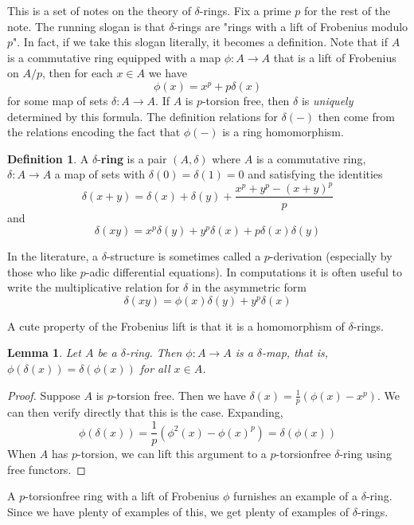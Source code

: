 \documentclass[12pt]{amsproc}
\newtheorem{lemma}{Lemma}
\theoremstyle{definition}
\newtheorem*{definition}{Definition}
\newcommand{\ra}{\rightarrow}
\begin{document}

This is a set of notes on the theory of $\delta$-rings. Fix a prime $p$ for the rest of the note. The running slogan is that $\delta$-rings are "rings with a lift of Frobenius modulo $p$". In fact, if we take this slogan literally, it becomes a definition. Note that if $A$ is a commutative ring equipped with a map $\phi:A\ra A$ that is a lift of Frobenius on $A/p$, then for each $x\in A$ we have
\[	\phi(x) = x^p + p\delta(x)	\]
for some map of sets $\delta:A\ra A$. If $A$ is $p$-torsion free, then $\delta$ is \textit{uniquely} determined by this formula. The definition relations for $\delta(-)$ then come from the relations encoding the fact that $\phi(-)$ is a ring homomorphism.

\begin{definition} A $\delta$-\textbf{ring} is a pair $(A,\delta)$ where $A$ is a commutative ring, $\delta:A\ra A$ a map of sets with $\delta(0)=\delta(1)=0$ and satisfying the identities
\[	\delta(x+y)=\delta(x)+\delta(y)+\frac{x^p+y^p-(x+y)^p}{p}\]
and
\[	\delta(xy)=x^p\delta(y)+y^p\delta(x)+p\delta(x)\delta(y)	\]
\end{definition}

In the literature, a $\delta$-structure is sometimes called a $p$-derivation (especially by those who like $p$-adic differential equations). In computations it is often useful to write the multiplicative relation for $\delta$ in the asymmetric form
\[	\delta(xy) = \phi(x)\delta(y)+y^p\delta(x)\]

A cute property of the Frobenius lift is that it is a homomorphism of $\delta$-rings.

\begin{lemma} Let $A$ be a $\delta$-ring. Then $\phi:A\ra A$ is a $\delta$-map, that is, $\phi(\delta(x))=\delta(\phi(x))$ for all $x\in A$.
\end{lemma}
\begin{proof} Suppose $A$ is $p$-torsion free. Then we have $\delta(x)=\frac{1}{p}(\phi(x)-x^p)$. We can then verify directly that this is the case. Expanding,
\[	\phi(\delta(x))=\frac{1}{p}(\phi^2(x)-\phi(x)^p)=\delta(\phi(x))	\]
When $A$ has $p$-torsion, we can lift this argument to a $p$-torsionfree $\delta$-ring using free functors.
\end{proof}

A $p$-torsionfree ring with a lift of Frobenius $\phi$ furnishes an example of a $\delta$-ring. Since we have plenty of examples of this, we get plenty of examples of $\delta$-rings.
\end{document}

